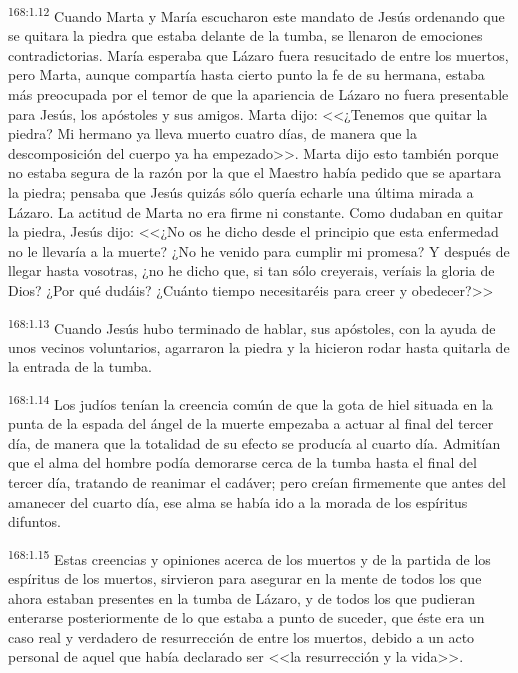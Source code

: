 \par 
\textsuperscript{168:1.12} Cuando Marta y María escucharon este mandato de Jesús ordenando que se quitara la piedra que estaba delante de la tumba, se llenaron de emociones contradictorias. María esperaba que Lázaro fuera resucitado de entre los muertos, pero Marta, aunque compartía hasta cierto punto la fe de su hermana, estaba más preocupada por el temor de que la apariencia de Lázaro no fuera presentable para Jesús, los apóstoles y sus amigos. Marta dijo: <<¿Tenemos que quitar la piedra? Mi hermano ya lleva muerto cuatro días, de manera que la descomposición del cuerpo ya ha empezado>>. Marta dijo esto también porque no estaba segura de la razón por la que el Maestro había pedido que se apartara la piedra; pensaba que Jesús quizás sólo quería echarle una última mirada a Lázaro. La actitud de Marta no era firme ni constante. Como dudaban en quitar la piedra, Jesús dijo: <<¿No os he dicho desde el principio que esta enfermedad no le llevaría a la muerte? ¿No he venido para cumplir mi promesa? Y después de llegar hasta vosotras, ¿no he dicho que, si tan sólo creyerais, veríais la gloria de Dios? ¿Por qué dudáis? ¿Cuánto tiempo necesitaréis para creer y obedecer?>>

\par 
\textsuperscript{168:1.13} Cuando Jesús hubo terminado de hablar, sus apóstoles, con la ayuda de unos vecinos voluntarios, agarraron la piedra y la hicieron rodar hasta quitarla de la entrada de la tumba.

\par 
\textsuperscript{168:1.14} Los judíos tenían la creencia común de que la gota de hiel situada en la punta de la espada del ángel de la muerte empezaba a actuar al final del tercer día, de manera que la totalidad de su efecto se producía al cuarto día. Admitían que el alma del hombre podía demorarse cerca de la tumba hasta el final del tercer día, tratando de reanimar el cadáver; pero creían firmemente que antes del amanecer del cuarto día, ese alma se había ido a la morada de los espíritus difuntos.

\par 
\textsuperscript{168:1.15} Estas creencias y opiniones acerca de los muertos y de la partida de los espíritus de los muertos, sirvieron para asegurar en la mente de todos los que ahora estaban presentes en la tumba de Lázaro, y de todos los que pudieran enterarse posteriormente de lo que estaba a punto de suceder, que éste era un caso real y verdadero de resurrección de entre los muertos, debido a un acto personal de aquel que había declarado ser <<la resurrección y la vida>>.

